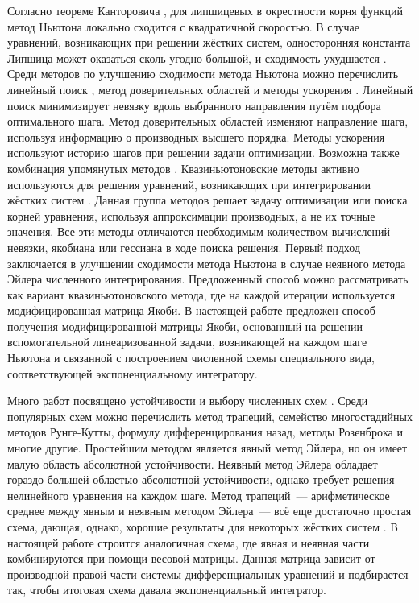 Согласно теореме Канторовича \cite{kantorovich1949method,ortega2000iterative}, для липшицевых в окрестности корня функций метод Ньютона локально сходится с квадратичной скоростью.
В случае уравнений, возникающих при решении жёстких систем, односторонняя константа Липшица может оказаться сколь угодно большой, и сходимость ухудшается \cite{auzinger1990note, auzinger1993modern}.
Среди методов по улучшению сходимости метода Ньютона можно перечислить линейный поиск \cite{armijo1966minimization, wolfe1969convergence},
метод доверительных областей \cite{sorensen1982newton} и методы ускорения \cite{anderson1965iterative, nesterov27method, brown1994convergence}.
Линейный поиск минимизирует невязку вдоль выбранного направления путём подбора оптимального шага.
Метод доверительных областей изменяют направление шага, используя информацию о производных высшего порядка.
Методы ускорения используют историю шагов при решении задачи оптимизации.
Возможна также комбинация упомянутых методов \cite{brune2015composing}.
Квазиньютоновские методы активно используются для решения уравнений, возникающих при интегрировании жёстких систем
\cite{brown1985experiments, alexander1991modified, moore1994stepsize, schlenkrich2006application}.
Данная группа методов решает задачу оптимизации или поиска корней уравнения, используя аппроксимации производных, а не их точные значения.
Все эти методы отличаются необходимым количеством вычислений невязки, якобиана или гессиана в ходе поиска решения.
Первый подход заключается в улучшении сходимости метода Ньютона в случае неявного метода Эйлера численного интегрирования.
Предложенный способ можно рассматривать как вариант квазиньютоновского метода, где на каждой итерации используется модифицированная матрица Якоби.
В настоящей работе предложен способ получения модифицированной матрицы Якоби, основанный на решении вспомогательной линеаризованной задачи,
возникающей на каждом шаге Ньютона и связанной с построением численной схемы специального вида,
соответствующей экспоненциальному интегратору.

Много работ посвящено устойчивости и выбору численных схем \cite{auzinger1993modern, dahlquist1963special, dahlquist1975stability, liu2019study}.
Среди популярных схем можно перечислить метод трапеций, семейство многостадийных методов Рунге-Кутты, формулу дифференцирования назад, методы Розенброка и многие другие.
Простейшим методом является явный метод Эйлера, но он имеет малую область абсолютной устойчивости.
Неявный метод Эйлера обладает гораздо большей областью абсолютной устойчивости, однако требует решения нелинейного уравнения на каждом шаге.
Метод трапеций~--- арифметическое среднее между явным и неявным методом Эйлера~--- всё еще достаточно простая схема,
дающая, однако, хорошие результаты для некоторых жёстких систем \cite{auzinger1989asymptotic}.
В настоящей работе строится аналогичная схема, где явная и неявная части комбинируются при помощи весовой матрицы.
Данная матрица зависит от производной правой части системы дифференциальных уравнений и подбирается так, чтобы итоговая схема давала экспоненциальный интегратор.

